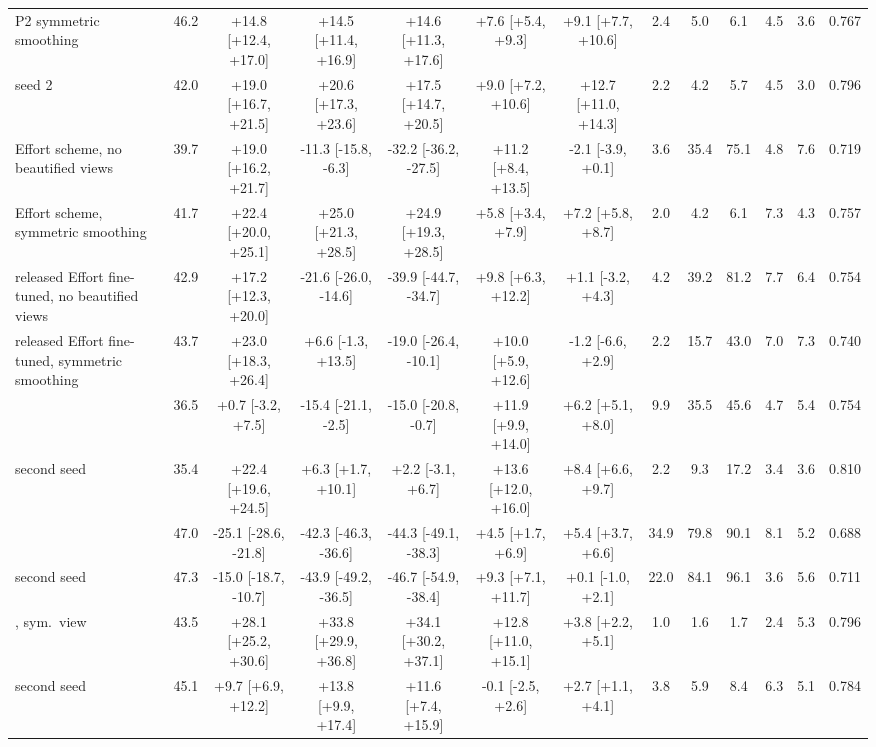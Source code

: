 \begin{tabular}{@{}l c ccccc ccccc c@{}}
P2 symmetric smoothing & 46.2 & +14.8 [+12.4, +17.0] & +14.5 [+11.4, +16.9] & +14.6 [+11.3, +17.6] & +7.6 [+5.4, +9.3] & +9.1 [+7.7, +10.6] & 2.4 & 5.0 & 6.1 & 4.5 & 3.6 & 0.767 \\
\quad seed 2 & 42.0 & +19.0 [+16.7, +21.5] & +20.6 [+17.3, +23.6] & +17.5 [+14.7, +20.5] & +9.0 [+7.2, +10.6] & +12.7 [+11.0, +14.3] & 2.2 & 4.2 & 5.7 & 4.5 & 3.0 & 0.796 \\
Effort scheme, no beautified views & 39.7 & +19.0 [+16.2, +21.7] & -11.3 [-15.8, -6.3] & -32.2 [-36.2, -27.5] & +11.2 [+8.4, +13.5] & -2.1 [-3.9, +0.1] & 3.6 & 35.4 & 75.1 & 4.8 & 7.6 & 0.719 \\
Effort scheme, symmetric smoothing & 41.7 & +22.4 [+20.0, +25.1] & +25.0 [+21.3, +28.5] & +24.9 [+19.3, +28.5] & +5.8 [+3.4, +7.9] & +7.2 [+5.8, +8.7] & 2.0 & 4.2 & 6.1 & 7.3 & 4.3 & 0.757 \\
released Effort fine-tuned, no beautified views & 42.9 & +17.2 [+12.3, +20.0] & -21.6 [-26.0, -14.6] & -39.9 [-44.7, -34.7] & +9.8 [+6.3, +12.2] & +1.1 [-3.2, +4.3] & 4.2 & 39.2 & 81.2 & 7.7 & 6.4 & 0.754 \\
released Effort fine-tuned, symmetric smoothing & 43.7 & +23.0 [+18.3, +26.4] & +6.6 [-1.3, +13.5] & -19.0 [-26.4, -10.1] & +10.0 [+5.9, +12.6] & -1.2 [-6.6, +2.9] & 2.2 & 15.7 & 43.0 & 7.0 & 7.3 & 0.740 \\
\oursB{} & 36.5 & +0.7 [-3.2, +7.5] & -15.4 [-21.1, -2.5] & -15.0 [-20.8, -0.7] & +11.9 [+9.9, +14.0] & +6.2 [+5.1, +8.0] & 9.9 & 35.5 & 45.6 & 4.7 & 5.4 & 0.754 \\
\quad second seed & 35.4 & +22.4 [+19.6, +24.5] & +6.3 [+1.7, +10.1] & +2.2 [-3.1, +6.7] & +13.6 [+12.0, +16.0] & +8.4 [+6.6, +9.7] & 2.2 & 9.3 & 17.2 & 3.4 & 3.6 & 0.810 \\
\oursF{} & 47.0 & -25.1 [-28.6, -21.8] & -42.3 [-46.3, -36.6] & -44.3 [-49.1, -38.3] & +4.5 [+1.7, +6.9] & +5.4 [+3.7, +6.6] & 34.9 & 79.8 & 90.1 & 8.1 & 5.2 & 0.688 \\
\quad second seed & 47.3 & -15.0 [-18.7, -10.7] & -43.9 [-49.2, -36.5] & -46.7 [-54.9, -38.4] & +9.3 [+7.1, +11.7] & +0.1 [-1.0, +2.1] & 22.0 & 84.1 & 96.1 & 3.6 & 5.6 & 0.711 \\
\oursF{}, sym.\ view & 43.5 & +28.1 [+25.2, +30.6] & +33.8 [+29.9, +36.8] & +34.1 [+30.2, +37.1] & +12.8 [+11.0, +15.1] & +3.8 [+2.2, +5.1] & 1.0 & 1.6 & 1.7 & 2.4 & 5.3 & 0.796 \\
\quad second seed & 45.1 & +9.7 [+6.9, +12.2] & +13.8 [+9.9, +17.4] & +11.6 [+7.4, +15.9] & -0.1 [-2.5, +2.6] & +2.7 [+1.1, +4.1] & 3.8 & 5.9 & 8.4 & 6.3 & 5.1 & 0.784 \\
\bottomrule
\end{tabular}
